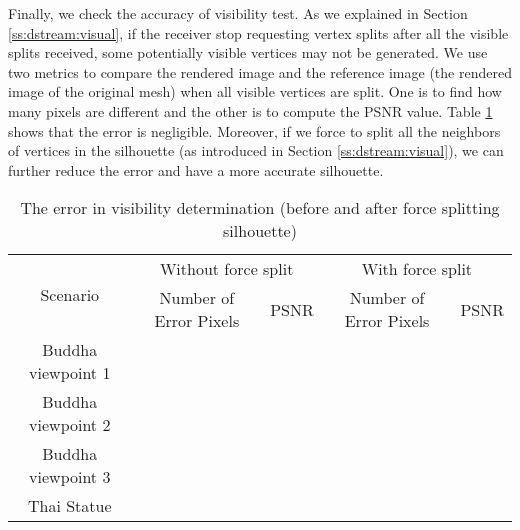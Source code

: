 Finally, we check the accuracy of visibility test. 
As we explained in Section \ref{ss:dstream:visual}, 
if the receiver stop requesting vertex splits after all the visible splits received,
some potentially visible vertices may not be generated.
We use two metrics to compare the rendered image and the reference image (the rendered image of the original mesh)
when all visible vertices are split. One is to find
how many pixels are different and the other is to compute the PSNR value. 
Table \ref{t:dstream:error} shows that the error is negligible.
Moreover, if we force to split all the neighbors of vertices in the silhouette
(as introduced in Section \ref{ss:dstream:visual}),
we can further reduce the error and have a more accurate silhouette.
\begin{table}
    \centering
    \begin{tabular}{|c|c|c|c|c|}
        \hline
        \multirow{2}{*}{Scenario}    &    \multicolumn{2}{c|}{Without force split}   & \multicolumn{2}{c|}{With force split}\\
        \cline{2-5}
         &   Number of Error Pixels   &   PSNR    &  Number of Error Pixels  & PSNR \\
        \hline
        Buddha viewpoint 1 &                           &           &                              &         \\
        Buddha viewpoint 2 &                           &           &                              &         \\
        Buddha viewpoint 3 &                           &           &                              &         \\
        Thai   Statue      &                           &           &                              &         \\
        \hline
    \end{tabular}
    \caption{The error in visibility determination (before and after force splitting silhouette)}
    \label{t:dstream:error}
\end{table}


